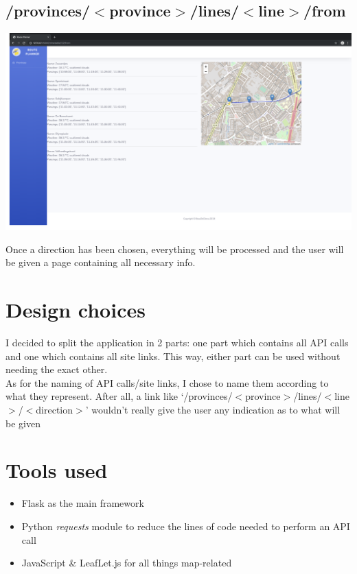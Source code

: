 \documentclass[12pt]{article}
\begin{document}
\subsection{/provinces/$<$province$>$/lines/$<$line$>$/from}
\begin{center}
	\includegraphics[width=\linewidth]{images/Route_from.png}
\end{center}
Once a direction has been chosen, everything will be processed and  the user will be given a page containing all necessary info.

\newpage

\section{Design choices}
I decided to split the application in 2 parts: one part which contains all API calls and one which contains all site links. This way, either part can be used without needing the exact other.\\
As for the naming of API calls/site links, I chose to name them according to what they represent. After all, a link like `/provinces/$<$province$>$/lines/$<$line$>$/$<$direction$>$' wouldn't really give the user any indication as to what will be given

\newpage

\section{Tools used}
\begin{itemize}
	\item Flask as the main framework
	\item Python \emph{requests} module to reduce the lines of code needed to perform an API call
	\item JavaScript \& LeafLet.js for all things map-related

\end{itemize}
\end{document}
